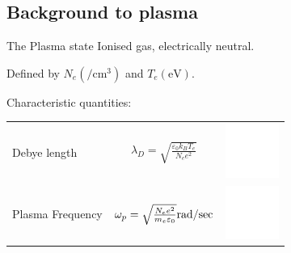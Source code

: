 \documentclass[dvipsnames]{beamer}
\begin{document}
\subsection[]{Background to plasma}
\begin{frame}{The Plasma state}
Ionised gas, electrically neutral.

Defined by $N_e\left(\si{\per\cubic\cm} \right)$ and $T_e\left(\si{\electronvolt} \right)$.

Characteristic quantities:
  \begin{tabular}{l c r}
  Debye length & $\lambda_D=\sqrt{\frac{\varepsilon_0 k_B T_e}{N_e e^2}}$ &  \includegraphics[height=50pt]{figures/theory/white_background.png}\\ 
  Plasma Frequency & $ \omega_p=\sqrt{\frac{N_e e^2}{m_e \varepsilon_0}}\si[per-mode=fraction]{\radian\per\sec} $ & \includegraphics[height=50pt]{figures/theory/white_background.png}\\
  \end{tabular}
\end{frame}
\end{document}
